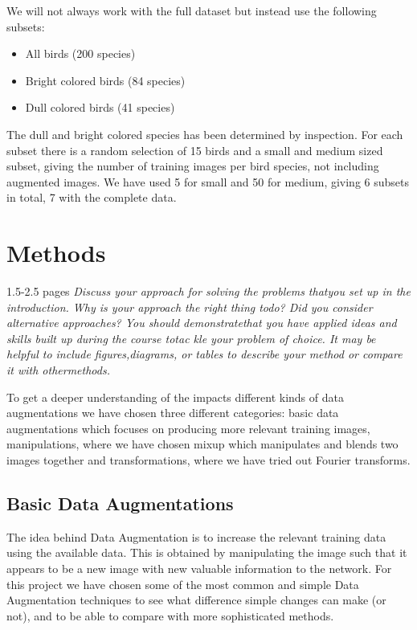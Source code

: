 \documentclass{article}
\begin{document}
We will not always work with the full dataset but instead use the following subsets:

\begin{itemize}
	\item All birds (200 species)
	\item Bright colored birds (84 species)
	\item Dull colored birds (41 species)
\end{itemize}

The dull and bright colored species has been determined by inspection. For each subset there is a random selection of 15 birds and a small and medium sized subset, giving the number of training images per bird species, not including augmented images. We have used 5 for small and 50 for medium, giving 6 subsets in total, 7 with the complete data.


\section{Methods}

1.5-2.5 pages
\textit{Discuss your approach for solving the problems thatyou set up in the introduction. Why is your approach the right thing todo? Did you consider alternative approaches? You should demonstratethat you have applied ideas and skills built up during the course totac	kle  your  problem  of  choice.   It  may  be  helpful  to  include  figures,diagrams, or tables to describe your method or compare it with othermethods.}

To get a deeper understanding of the impacts different kinds of data augmentations we have chosen three different categories: basic data augmentations which focuses on producing more relevant training images, manipulations, where we have chosen mixup which manipulates and blends two images together and transformations, where we have tried out Fourier transforms. 

\subsection{Basic Data Augmentations}
The idea behind Data Augmentation is to increase the relevant training data using the available data. This is obtained by manipulating the image such that it appears to be a new image with new valuable information to the network. For this project we have chosen some of the most common and simple Data Augmentation techniques to see what difference simple changes can make (or not), and to be able to compare with more sophisticated methods. 
\end{document}
